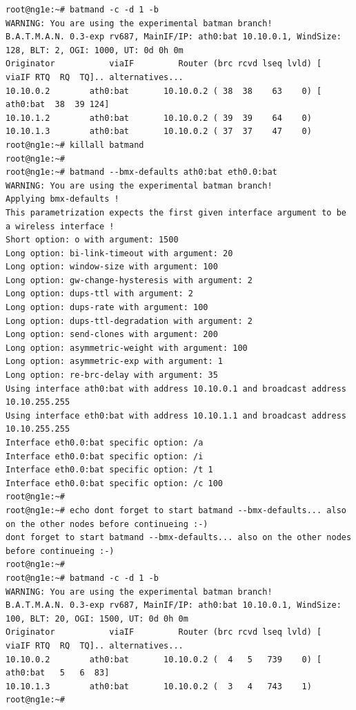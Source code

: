 \documentclass[11pt]{article}
\begin{document}
\begin{enumerate}
\begin{small} \begin{verbatim}
root@ng1e:~# batmand -c -d 1 -b
WARNING: You are using the experimental batman branch!
B.A.T.M.A.N. 0.3-exp rv687, MainIF/IP: ath0:bat 10.10.0.1, WindSize: 128, BLT: 2, OGI: 1000, UT: 0d 0h 0m
Originator           viaIF         Router (brc rcvd lseq lvld) [    viaIF RTQ  RQ  TQ].. alternatives...
10.10.0.2        ath0:bat       10.10.0.2 ( 38  38    63    0) [ ath0:bat  38  39 124]
10.10.1.2        ath0:bat       10.10.0.2 ( 39  39    64    0)
10.10.1.3        ath0:bat       10.10.0.2 ( 37  37    47    0)
root@ng1e:~# killall batmand
root@ng1e:~#
root@ng1e:~# batmand --bmx-defaults ath0:bat eth0.0:bat
WARNING: You are using the experimental batman branch!
Applying bmx-defaults !
This parametrization expects the first given interface argument to be a wireless interface !
Short option: o with argument: 1500
Long option: bi-link-timeout with argument: 20
Long option: window-size with argument: 100
Long option: gw-change-hysteresis with argument: 2
Long option: dups-ttl with argument: 2
Long option: dups-rate with argument: 100
Long option: dups-ttl-degradation with argument: 2
Long option: send-clones with argument: 200
Long option: asymmetric-weight with argument: 100
Long option: asymmetric-exp with argument: 1
Long option: re-brc-delay with argument: 35
Using interface ath0:bat with address 10.10.0.1 and broadcast address 10.10.255.255
Using interface eth0:bat with address 10.10.1.1 and broadcast address 10.10.255.255
Interface eth0.0:bat specific option: /a
Interface eth0.0:bat specific option: /i
Interface eth0.0:bat specific option: /t 1
Interface eth0.0:bat specific option: /c 100
root@ng1e:~#
root@ng1e:~# echo dont forget to start batmand --bmx-defaults... also on the other nodes before continueing :-)
dont forget to start batmand --bmx-defaults... also on the other nodes before continueing :-)
root@ng1e:~#
root@ng1e:~# batmand -c -d 1 -b
WARNING: You are using the experimental batman branch!
B.A.T.M.A.N. 0.3-exp rv687, MainIF/IP: ath0:bat 10.10.0.1, WindSize: 100, BLT: 20, OGI: 1500, UT: 0d 0h 0m
Originator           viaIF         Router (brc rcvd lseq lvld) [    viaIF RTQ  RQ  TQ].. alternatives...
10.10.0.2        ath0:bat       10.10.0.2 (  4   5   739    0) [ ath0:bat   5   6  83]
10.10.1.3        ath0:bat       10.10.0.2 (  3   4   743    1)
root@ng1e:~#

\end{verbatim} \end{small}


\end{enumerate}
\end{document}
